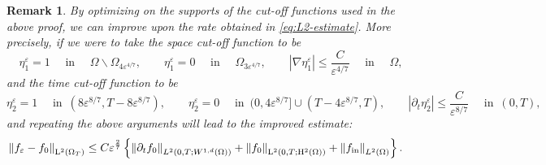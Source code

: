 \documentclass[preprint, 12pt]{amsart}
\numberwithin{equation}{section}
\newtheorem{remark}[theorem]{Remark}        %
\numberwithin{equation}{section}
\newcommand{\eps}{\varepsilon}
\begin{document}
\begin{remark}\label{rem:improved-rate}
By optimizing on the supports of the cut-off functions used in the above proof, we can improve upon the rate obtained in \eqref{eq:L2-estimate}. More precisely, if we were to take the space cut-off function to be
\[
\eta_1^\eps = 1 \quad \mbox{ in }\quad \Omega \backslash \Omega_{4{\varepsilon}^{ 4/7}},
\qquad
\eta_1^\eps = 0 \quad \mbox{ in }\quad \Omega_{3{\varepsilon}^{ 4/7}},
\qquad
\left\vert\nabla \eta_1^\eps \right\vert \leq \frac{C}{{\eps}^{ 4/7}} \quad \mbox{ in }\quad \Omega,
\]
and the time cut-off function to be
\[
\eta_2^\eps = 1 \quad \mbox{ in }\, \left(8\eps^{ 8/7}, T-8\eps^{ 8/7}\right),
\qquad
\eta_2^\eps = 0 \quad \mbox{ in }\, (0,4\eps^{ 8/7}]\cup(T-4\eps^{ 8/7},T),
\qquad 
\left\vert \partial_t \eta_2^\eps\right\vert \leq \frac{C}{\eps^{ 8/7}} \quad \mbox{ in }\, (0,T),
\]
and repeating the above arguments will lead to the improved estimate:
\begin{equation*}
\begin{aligned}
\left \Vert f_\eps - f_0 \right\Vert_{\mathrm L^2(\Omega_T)}  
&
\le C \eps^{\frac 27} \left\{ \left\Vert \partial_tf_0\right\Vert_{L^2(0,T;W^{1,d}(\Omega))} + \left\Vert f_0\right\Vert_{\mathrm L^2(0,T;\mathrm H^2(\Omega))} + \left\Vert f_{{\rm{in}}}\right\Vert_{L^2(\Omega)} \right\}. 
\end{aligned}
\end{equation*}
\end{remark}
\end{document}
